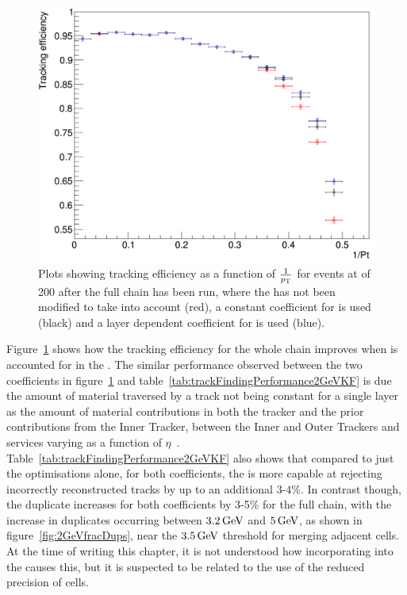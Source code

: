 \begin{figure}[tbp]
\centering
\includegraphics[width=\textwidth]{figs/tk-upgrade/results-lowPtTracking/kfTrackingEffVsInvPtFlatGeometry_5000.pdf}
\caption{Plots showing tracking efficiency as a function of $\frac{1}{p_{\mathrm{T}}}$ for \ttbar events at \PU of 200 after the full chain has been run, where the \KF has not been modified to take \MS into account (red), a constant coefficient for \MS is used (black) and a layer dependent coefficient for \MS is used (blue).
}
\label{fig:2GeVTiltEff}	
\end{figure}

Figure~\ref{fig:2GeVTiltEff} shows how the tracking efficiency for the whole chain improves when \MS is accounted for in the \KF.
The similar performance observed between the two coefficients in figure~\ref{fig:2GeVTiltEff} and table~\ref{tab:trackFindingPerformance2GeVKF} is due the amount of material traversed by a track not being constant for a single layer as the amount of material contributions in both the tracker and the prior contributions from the Inner Tracker, between the Inner and Outer Trackers and services varying as a function of $\eta$~\cite{P2TrackerTDR}.
Table~\ref{tab:trackFindingPerformance2GeVKF} also shows that compared to just the \HT optimisations alone, for both \MS  coefficients, the \KF is more capable at rejecting incorrectly reconstructed tracks by up to an additional 3-4\%.
In contrast though, the duplicate increases for both coefficients by 3-5\% for the full chain, with the increase in duplicates occurring between $3.2\,\text{Ge\hspace{-.08em}V}$ and $5\,\text{Ge\hspace{-.08em}V}$, as shown in figure~\ref{fig:2GeVfracDups}, near the $3.5\,\text{Ge\hspace{-.08em}V}$ threshold for merging adjacent \HT cells.
At the time of writing this chapter, it is not understood how incorporating \MS into the \KF causes this, but it is suspected to be related to the use of the reduced precision of \HT cells.

